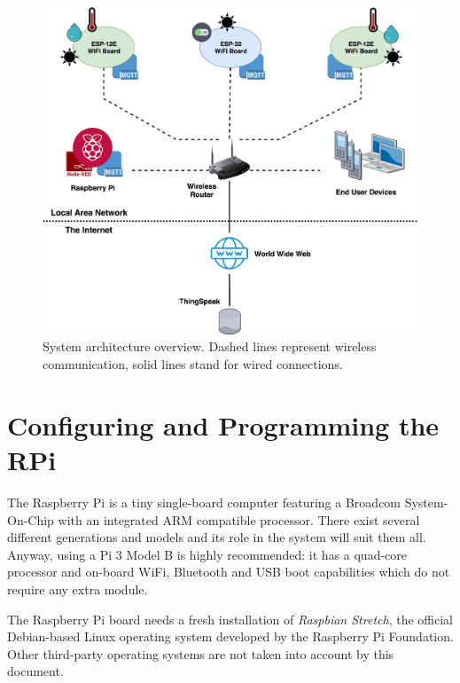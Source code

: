 \begin{figure}[H]
	\begin{center}
		\includegraphics[width=\textwidth]{./pictures/architecture_overview.png}
		\caption{System architecture overview. Dashed lines represent wireless communication, solid lines stand for wired connections.}
		\label{architecture_overview}
	\end{center}
\end{figure}

\newpage
\section{Configuring and Programming the RPi}
The Raspberry Pi is a tiny single-board computer featuring a Broadcom System-On-Chip with an integrated ARM compatible processor. There exist several different generations and models and its role in the system will suit them all. Anyway, using a Pi 3 Model B is highly recommended: it has a quad-core processor and on-board WiFi, Bluetooth and USB boot capabilities which do not require any extra module.

The Raspberry Pi board needs a fresh installation of \textit{Raspbian Stretch}, the official Debian-based Linux operating system developed by the Raspberry Pi Foundation. Other third-party operating systems are not taken into account by this document.


